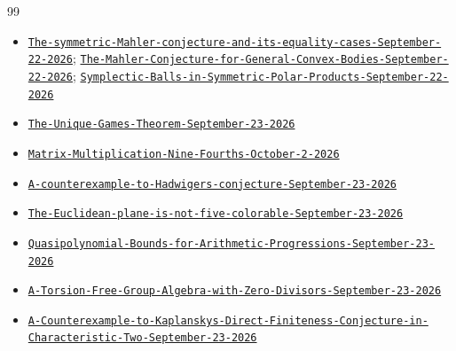 \documentclass[11pt]{article}
\begin{document}
\begin{thebibliography}{99}
\begin{itemize}[nosep,leftmargin=2.2em,labelsep=0.5em]
\item[087] {\small \href{https://github.com/openai/math/tree/fd4aeeb2ee4fc729c18d98444fed42fd0529eeeb/preprints/The-symmetric-Mahler-conjecture-and-its-equality-cases-September-22-2026}{\nolinkurl{The-symmetric-Mahler-conjecture-and-its-equality-cases-September-22-2026}}; \href{https://github.com/openai/math/tree/fd4aeeb2ee4fc729c18d98444fed42fd0529eeeb/preprints/The-Mahler-Conjecture-for-General-Convex-Bodies-September-22-2026}{\nolinkurl{The-Mahler-Conjecture-for-General-Convex-Bodies-September-22-2026}}; \href{https://github.com/openai/math/tree/fd4aeeb2ee4fc729c18d98444fed42fd0529eeeb/preprints/Symplectic-Balls-in-Symmetric-Polar-Products-September-22-2026}{\nolinkurl{Symplectic-Balls-in-Symmetric-Polar-Products-September-22-2026}}}
\item[102] {\small \href{https://github.com/openai/math/tree/fd4aeeb2ee4fc729c18d98444fed42fd0529eeeb/preprints/The-Unique-Games-Theorem-September-23-2026}{\nolinkurl{The-Unique-Games-Theorem-September-23-2026}}}
\item[107] {\small \href{https://github.com/openai/math/tree/fd4aeeb2ee4fc729c18d98444fed42fd0529eeeb/preprints/Matrix-Multiplication-Nine-Fourths-October-2-2026}{\nolinkurl{Matrix-Multiplication-Nine-Fourths-October-2-2026}}}
\item[157] {\small \href{https://github.com/openai/math/tree/fd4aeeb2ee4fc729c18d98444fed42fd0529eeeb/preprints/A-counterexample-to-Hadwigers-conjecture-September-23-2026}{\nolinkurl{A-counterexample-to-Hadwigers-conjecture-September-23-2026}}}
\item[158] {\small \href{https://github.com/openai/math/tree/fd4aeeb2ee4fc729c18d98444fed42fd0529eeeb/preprints/The-Euclidean-plane-is-not-five-colorable-September-23-2026}{\nolinkurl{The-Euclidean-plane-is-not-five-colorable-September-23-2026}}}
\item[159] {\small \href{https://github.com/openai/math/tree/fd4aeeb2ee4fc729c18d98444fed42fd0529eeeb/preprints/Quasipolynomial-Bounds-for-Arithmetic-Progressions-September-23-2026}{\nolinkurl{Quasipolynomial-Bounds-for-Arithmetic-Progressions-September-23-2026}}}
\item[196] {\small \href{https://github.com/openai/math/tree/fd4aeeb2ee4fc729c18d98444fed42fd0529eeeb/preprints/A-Torsion-Free-Group-Algebra-with-Zero-Divisors-September-23-2026}{\nolinkurl{A-Torsion-Free-Group-Algebra-with-Zero-Divisors-September-23-2026}}}
\item[197] {\small \href{https://github.com/openai/math/tree/fd4aeeb2ee4fc729c18d98444fed42fd0529eeeb/preprints/A-Counterexample-to-Kaplanskys-Direct-Finiteness-Conjecture-in-Characteristic-Two-September-23-2026}{\nolinkurl{A-Counterexample-to-Kaplanskys-Direct-Finiteness-Conjecture-in-Characteristic-Two-September-23-2026}}}

\end{itemize}
\end{thebibliography}
\end{document}
